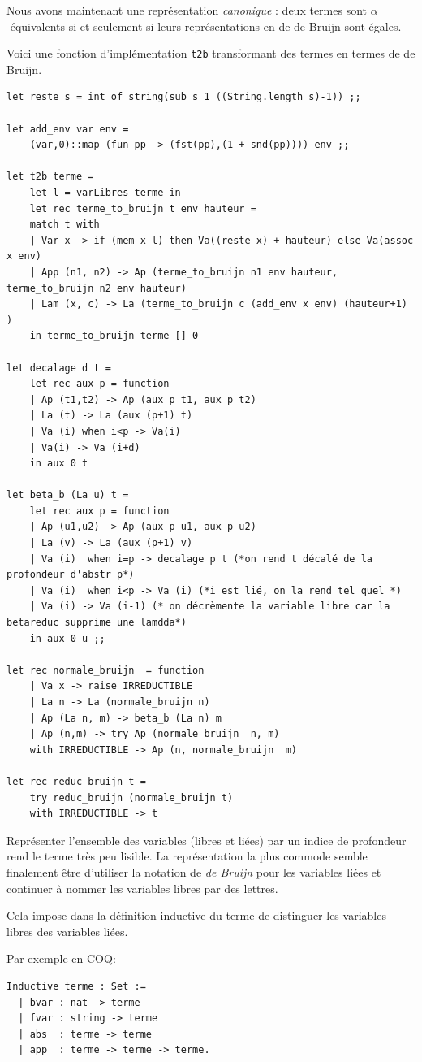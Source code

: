  Nous avons maintenant une représentation \textit{canonique} : deux termes sont $\alpha$-équivalents
 si et seulement si leurs représentations en de de Bruijn sont égales.


Voici une fonction d'implémentation \verb+t2b+ transformant des termes en termes de de Bruijn.
\begin{Verbatim}
let reste s = int_of_string(sub s 1 ((String.length s)-1)) ;;

let add_env var env =
	(var,0)::map (fun pp -> (fst(pp),(1 + snd(pp)))) env ;;

let t2b terme =
	let l = varLibres terme in
	let rec terme_to_bruijn t env hauteur =
	match t with
	| Var x -> if (mem x l) then Va((reste x) + hauteur) else Va(assoc x env)
	| App (n1, n2) -> Ap (terme_to_bruijn n1 env hauteur, terme_to_bruijn n2 env hauteur) 
	| Lam (x, c) -> La (terme_to_bruijn c (add_env x env) (hauteur+1) )
	in terme_to_bruijn terme [] 0

let decalage d t =
	let rec aux p = function
	| Ap (t1,t2) -> Ap (aux p t1, aux p t2) 
	| La (t) -> La (aux (p+1) t)
	| Va (i) when i<p -> Va(i)
	| Va(i) -> Va (i+d)
	in aux 0 t

let beta_b (La u) t =
	let rec aux p = function
	| Ap (u1,u2) -> Ap (aux p u1, aux p u2)
	| La (v) -> La (aux (p+1) v)
	| Va (i)  when i=p -> decalage p t (*on rend t décalé de la profondeur d'abstr p*)
	| Va (i)  when i<p -> Va (i) (*i est lié, on la rend tel quel *)
	| Va (i) -> Va (i-1) (* on décrèmente la variable libre car la betareduc supprime une lamdda*)
	in aux 0 u ;;

let rec normale_bruijn  = function
	| Va x -> raise IRREDUCTIBLE
	| La n -> La (normale_bruijn n)
	| Ap (La n, m) -> beta_b (La n) m
	| Ap (n,m) -> try Ap (normale_bruijn  n, m)
	with IRREDUCTIBLE -> Ap (n, normale_bruijn  m)

let rec reduc_bruijn t =
	try reduc_bruijn (normale_bruijn t)
	with IRREDUCTIBLE -> t 
\end{Verbatim}

Représenter l'ensemble des variables (libres et liées) par un indice de profondeur rend le terme très peu lisible.
La représentation la plus commode semble finalement être d'utiliser la notation de \textit{de Bruijn}  pour les variables liées
 et continuer
à nommer les variables libres par des lettres.

Cela impose dans la définition inductive du terme de distinguer les variables libres des variables liées.

Par exemple en COQ: \begin{Verbatim}
Inductive terme : Set :=
  | bvar : nat -> terme
  | fvar : string -> terme
  | abs  : terme -> terme
  | app  : terme -> terme -> terme.
\end{Verbatim}

